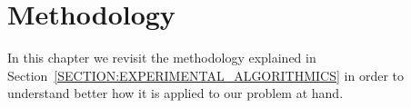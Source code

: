 

\chapter{Methodology}
\label{CHAPTER:METHODLOGY}

In this chapter we revisit the methodology explained in Section~\ref{SECTION:EXPERIMENTAL_ALGORITHMICS} in order to understand better how it is applied to our problem at hand.



